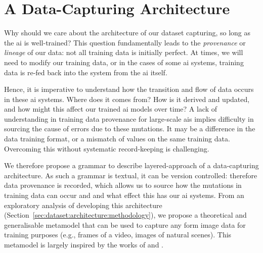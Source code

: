 \section{A Data-Capturing Architecture}
\label{sec:dataset:architecture}

Why should we care about the architecture of our dataset capturing, so long as the \gls{ai} is well-trained? This question fundamentally leads to the \textit{provenance} or \textit{lineage} of our data: not all training data is initially perfect. At times, we will need to modify our training data, or in the cases of some \gls{ai} systems, training data is re-fed back into the system from the \gls{ai} itself. 

Hence, it is imperative to understand how the transition and flow of data occurs \citep{Cui:2003im,Ikeda:2009ca,Buneman:2000bn} in these \gls{ai} systems. Where does it comes from? How is it derived and updated, and how might this affect our trained \gls{ai} models over time? A lack of understanding in training data provenance for large-scale \glspl{ai} implies difficulty in sourcing the cause of errors due to these mutations. It may be a difference in the data training format, or a mismatch of values on the same training data. Overcoming this without systematic record-keeping is challenging.

We therefore propose a grammar to describe layered-approach of a data-capturing architecture. As such a grammar is textual, it can be version controlled: therefore data provenance is recorded, which allows us to source how the mutations in training data can occur and and what effect this has our \gls{ai} systems. From an exploratory analysis of developing this architecture (Section~\ref{sec:dataset:architecture:methodology}), we propose a theoretical and generalisable metamodel that can be used to capture any form image data for training purposes (e.g., frames of a video, images of natural scenes). This metamodel is largely inspired by the works of \citet{Wickham:2010hy, Wickham:2007tu} and \citet{Moody:2009vo}.


\clearpage


